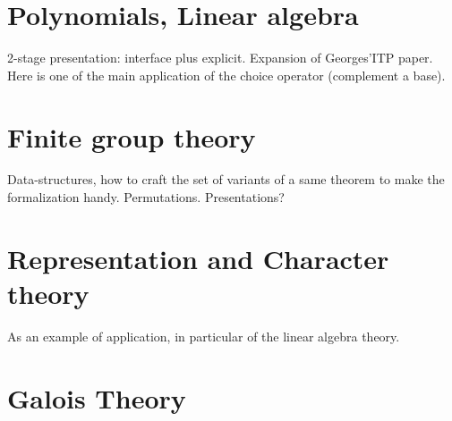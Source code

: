 \documentclass{book}
\begin{document}


\chapter{Polynomials, Linear algebra}

2-stage presentation: interface plus explicit. Expansion of
Georges'ITP paper. Here is one of the main application of the choice
operator (complement a base).


\chapter{Finite group theory}

Data-structures, how to craft the set of variants of a same theorem to
make the formalization handy. Permutations. Presentations?

\chapter{Representation and Character theory}

As an example of application, in particular of the linear algebra
theory.

\chapter{Galois Theory}




% 
\end{document}
